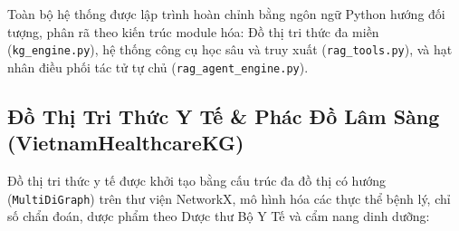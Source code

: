 \documentclass[12pt,a4paper]{report}
\begin{document}
Toàn bộ hệ thống được lập trình hoàn chỉnh bằng ngôn ngữ Python hướng đối tượng, phân rã theo kiến trúc module hóa: Đồ thị tri thức đa miền (\texttt{kg\_engine.py}), hệ thống công cụ học sâu và truy xuất (\texttt{rag\_tools.py}), và hạt nhân điều phối tác tử tự chủ (\texttt{rag\_agent\_engine.py}).

\subsection{Đồ Thị Tri Thức Y Tế \& Phác Đồ Lâm Sàng (VietnamHealthcareKG)}

Đồ thị tri thức y tế được khởi tạo bằng cấu trúc đa đồ thị có hướng (\texttt{MultiDiGraph}) trên thư viện NetworkX, mô hình hóa các thực thể bệnh lý, chỉ số chẩn đoán, dược phẩm theo Dược thư Bộ Y Tế và cẩm nang dinh dưỡng:
\end{document}
